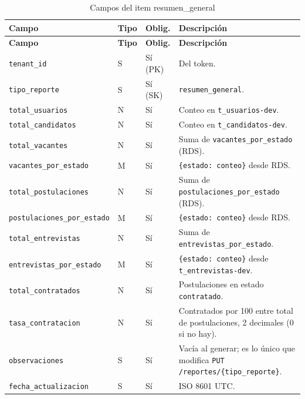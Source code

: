 \begin{longtable}{p{4cm}p{1.2cm}p{1.4cm}p{7.4cm}}
\caption{Campos del item resumen\_general}\\
\toprule
\textbf{Campo} & \textbf{Tipo} & \textbf{Oblig.} & \textbf{Descripción} \\
\midrule
\endfirsthead
\toprule
\textbf{Campo} & \textbf{Tipo} & \textbf{Oblig.} & \textbf{Descripción} \\
\midrule
\endhead
\bottomrule
\endlastfoot
\texttt{tenant\_\allowbreak{}id} & S & Sí (PK) & Del token. \\
\texttt{tipo\_\allowbreak{}reporte} & S & Sí (SK) & \texttt{resumen\_\allowbreak{}general}. \\
\texttt{total\_\allowbreak{}usuarios} & N & Sí & Conteo en \texttt{t\_\allowbreak{}usuarios-\allowbreak{}dev}. \\
\texttt{total\_\allowbreak{}candidatos} & N & Sí & Conteo en \texttt{t\_\allowbreak{}candidatos-\allowbreak{}dev}. \\
\texttt{total\_\allowbreak{}vacantes} & N & Sí & Suma de \texttt{vacantes\_\allowbreak{}por\_\allowbreak{}estado} (RDS). \\
\texttt{vacantes\_\allowbreak{}por\_\allowbreak{}estado} & M & Sí & \texttt{\{estado: conteo\}} desde RDS. \\
\texttt{total\_\allowbreak{}postulaciones} & N & Sí & Suma de \texttt{postulaciones\_\allowbreak{}por\_\allowbreak{}estado} (RDS). \\
\texttt{postulaciones\_\allowbreak{}por\_\allowbreak{}estado} & M & Sí & \texttt{\{estado: conteo\}} desde RDS. \\
\texttt{total\_\allowbreak{}entrevistas} & N & Sí & Suma de \texttt{entrevistas\_\allowbreak{}por\_\allowbreak{}estado}. \\
\texttt{entrevistas\_\allowbreak{}por\_\allowbreak{}estado} & M & Sí & \texttt{\{estado: conteo\}} desde \texttt{t\_\allowbreak{}entrevistas-\allowbreak{}dev}. \\
\texttt{total\_\allowbreak{}contratados} & N & Sí & Postulaciones en estado \texttt{contratado}. \\
\texttt{tasa\_\allowbreak{}contratacion} & N & Sí & Contratados por 100 entre total de postulaciones, 2 decimales (0 si no hay). \\
\texttt{observaciones} & S & Sí & Vacía al generar; es lo único que modifica \texttt{PUT /reportes/\{tipo\_\allowbreak{}reporte\}}. \\
\texttt{fecha\_\allowbreak{}actualizacion} & S & Sí & ISO 8601 UTC. \\
\end{longtable}

